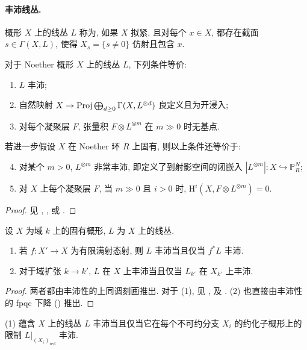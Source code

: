 \paragraph{丰沛线丛.}
概形 $X$ 上的线丛 $L$ 称为, 如果 $X$ 拟紧, 且对每个 $x\in X$, 都存在截面 $s\in\Gamma(X,L)$, 使得 $X_s=\{s\neq0\}$ 仿射且包含 $x$.
\begin{proposition}[丰沛性的刻画]\label{src:B.2.8}
对于 Noether 概形 $X$ 上的线丛 $L$, 下列条件等价:
\begin{enumerate}[(1)]
\item $L$ 丰沛;
\item 自然映射 $X\to\operatorname{Proj}\bigoplus_{d\geq0}\Gamma(X,L^{\otimes d})$ 良定义且为开浸入;
\item 对每个凝聚层 $F$, 张量积 $F\otimes L^{\otimes m}$ 在 $m\gg0$ 时无基点.
\end{enumerate}
若进一步假设 $X$ 在 Noether 环 $R$ 上固有, 则以上条件还等价于:
\begin{enumerate}[(1)]
\setcounter{enumi}{3}
\item 对某个 $m>0$, $L^{\otimes m}$ 非常丰沛, 即定义了到射影空间的闭嵌入 $|L^{\otimes m}|:X\hookrightarrow\mathbb P^N_R$;
\item 对 $X$ 上每个凝聚层 $F$, 当 $m\gg0$ 且 $i>0$ 时, $\mathrm H^i(X,F\otimes L^{\otimes m})=0$.
\end{enumerate}
\end{proposition}
\begin{proof}
见 \cite[\S II.$7$ 及 III.$5.3$]{Har77}, \cite[II.$4.5$ 及 III.$2.6$]{EGA}, 或 \cite[Tags 01PR 及 0B5U]{SP}.
\end{proof}
\begin{proposition}[丰沛性的性质]\label{src:B.2.9}
设 $X$ 为域 $k$ 上的固有概形, $L$ 为 $X$ 上的线丛.
\begin{enumerate}[(1)]
\item 若 $f:X'\to X$ 为有限满射态射, 则 $L$ 丰沛当且仅当 $f^*L$ 丰沛.
\item 对于域扩张 $k\to k'$, $L$ 在 $X$ 上丰沛当且仅当 $L_{k'}$ 在 $X_{k'}$ 上丰沛.
\end{enumerate}
\end{proposition}
\begin{proof}
两者都由丰沛性的上同调刻画推出. 对于 (1), 见 \cite[习题 III.$5.7$]{Har77}, \cite[III.$2.6.2$]{EGA} 及 \cite[Tag 0B5V]{SP}. (2) 也直接由丰沛性的 fpqc 下降 () 推出.
\end{proof}
(1) 蕴含 $X$ 上的线丛 $L$ 丰沛当且仅当它在每个不可约分支 $X_i$ 的约化子概形上的限制 $L|_{(X_i)_{\mathrm{red}}}$ 丰沛.
